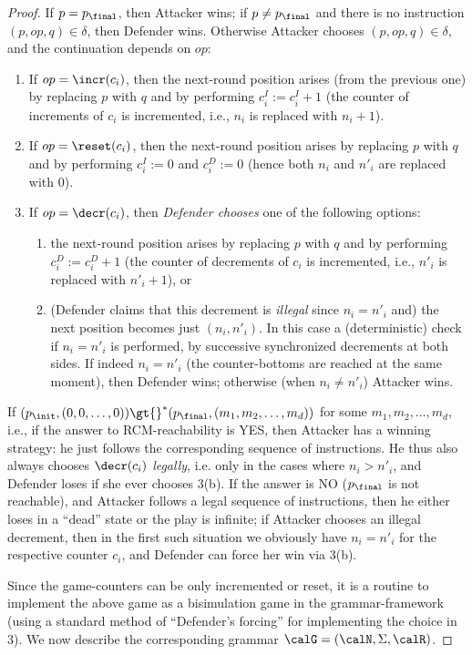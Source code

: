 \documentclass[a4paper,11pt]{article}
\begin{document}
\begin{proof}
If $p=p_\final$, then Attacker wins;
if  $p\neq p_\final$ and there is no instruction $(p,op,q)\in\delta$, then 
Defender wins.
Otherwise Attacker chooses $(p,op,q)\in\delta$, and the continuation
depends on $op$:
\begin{enumerate}
\item
If $op=\incr(c_i)$, then the next-round position arises (from the
previous one) by replacing $p$ with $q$ and by performing 
$c^I_i:=c^I_i{+}1$ (the counter of increments of $c_i$ is
incremented, i.e., $n_i$ is replaced with $n_i{+}1$).
\item
If $op=\reset(c_i)$, then the next-round position arises 
by replacing $p$ with $q$ and by performing 
$c^I_i:=0$ and $c^D_i:=0$ (hence both $n_i$ and $n'_i$ are replaced
with $0$).
\item
If $op=\decr(c_i)$, then \emph{Defender chooses} one of the following
options:
\begin{enumerate}
\item
the next-round position arises 
by replacing $p$ with $q$ and by performing 
$c^D_i:=c^D_i{+}1$ (the counter of decrements of $c_i$ is
incremented, i.e., $n'_i$ is replaced with $n'_i{+}1$), or
\item
	(Defender claims that this decrement is \emph{illegal} since $n_i=n'_i$ and)
the next position becomes just $(n_i,n'_i)$. 
In this case a (deterministic) check if $n_i=n'_i$ 
is performed, by successive
synchronized decrements at both sides. If indeed
$n_i=n'_i$ (the counter-bottoms are reached at the same moment),
then Defender wins; otherwise (when $n_i\neq n'_i$)
Attacker wins.
\end{enumerate}
\end{enumerate}
If
$(p_\init,(0,0,\dots,0))\gt{}^*(p_\final,(m_1,m_2,\dots,m_d))$ for some
$m_1,m_2,\dots,m_d$, i.e., if the answer to RCM-reachability is YES,
then Attacker has a winning strategy: he just follows the
corresponding
sequence of instructions. He thus also always chooses $\decr(c_i)$
\emph{legally},
i.e. only in the cases where $n_i>n'_i$, and Defender loses if
she ever chooses 3(b).
If the answer is NO ($p_\final$ is not reachable), and Attacker
follows a legal sequence of instructions, then he
either loses in a ``dead'' state or the play is infinite; if Attacker
chooses an illegal decrement, then in the first such situation we
obviously have
$n_i=n'_i$ for the respective counter $c_i$, and Defender can force
her win via 3(b).


Since the game-counters can be only incremented or reset, it is a
routine
to implement the above game as a bisimulation game in the
grammar-framework
(using a standard
method of ``Defender's forcing'' for implementing the choice in 3).
We now describe the corresponding 
grammar $\calG=(\calN,\Sigma,\calR)$.


\end{proof}
\end{document}
